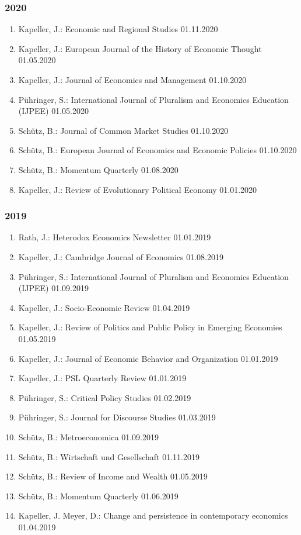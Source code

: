 \subsubsection*{2020}
\begin{enumerate}
	\item Kapeller, J.: Economic and Regional Studies 01.11.2020
	\item Kapeller, J.: European Journal of the History of Economic Thought 01.05.2020
	\item Kapeller, J.: Journal of Economics and Management 01.10.2020
	\item Pühringer, S.: International Journal of Pluralism and Economics Education (IJPEE) 01.05.2020
	\item Schütz, B.: Journal of Common Market Studies 01.10.2020
	\item Schütz, B.: European Journal of Economics and Economic Policies 01.10.2020
	\item Schütz, B.: Momentum Quarterly 01.08.2020
	\item Kapeller, J.: Review of Evolutionary Political Economy 01.01.2020
\end{enumerate}
\subsubsection*{2019}
\begin{enumerate}
	\item Rath, J.: Heterodox Economics Newsletter 01.01.2019
	\item Kapeller, J.: Cambridge Journal of Economics 01.08.2019
	\item Pühringer, S.: International Journal of Pluralism and Economics Education (IJPEE) 01.09.2019
	\item Kapeller, J.: Socio-Economic Review 01.04.2019
	\item Kapeller, J.: Review of Politics and Public Policy in Emerging Economies 01.05.2019
	\item Kapeller, J.: Journal of Economic Behavior and Organization 01.01.2019
	\item Kapeller, J.: PSL Quarterly Review 01.01.2019
	\item Pühringer, S.: Critical Policy Studies 01.02.2019
	\item Pühringer, S.: Journal for Discourse Studies 01.03.2019
	\item Schütz, B.: Metroeconomica 01.09.2019
	\item Schütz, B.: Wirtschaft und Gesellschaft 01.11.2019
	\item Schütz, B.: Review of Income and Wealth 01.05.2019
	\item Schütz, B.: Momentum Quarterly 01.06.2019
	\item Kapeller, J. Meyer, D.: Change and persistence in contemporary economics 01.04.2019
\end{enumerate}
